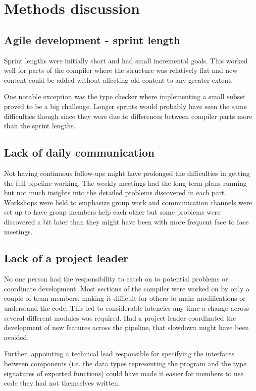 \section{Methods discussion}

\subsection{Agile development - sprint length}

Sprint lengths were initially short and had small incremental goals. This worked well for parts of the compiler where the structure was relatively flat and new content could be added without affecting old content to any greater extent. 

One notable exception was the type checker where implementing a small subset proved to be a big challenge. Longer sprints would probably have seen the same difficulties though since they were due to differences between compiler parts more than the sprint lengths.

\subsection{Lack of daily communication}

Not having continuous follow-ups might have prolonged the difficulties in getting the full pipeline working. The weekly meetings had the long term plans running but not much insights into the detailed problems discovered in each part. Workshops were held to emphasize group work and communication channels were set up to have group members help each other but some problems were discovered a bit later than they might have been with more frequent face to face meetings.

\subsection{Lack of a project leader}

No one person had the responsibility to catch on to potential problems or coordinate development. Most sections of the compiler were worked on by only a couple of team members, making it difficult for others to make modifications or understand the code. This led to considerable latencies any time a change across several different modules was required. Had a project leader coordinated the development of new features across the pipeline, that slowdown might have been avoided.

Further, appointing a technical lead responsible for specifying the interfaces between components (i.e. the data types representing the program and the type signatures of exported functions) could have made it easier for members to use code they had not themselves written.


